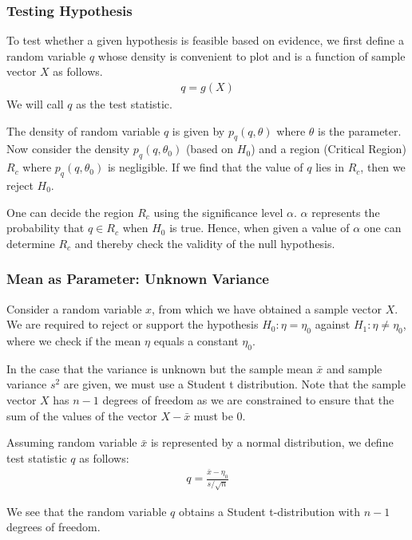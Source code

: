 \documentclass{beamer}
\begin{document}
\begin{frame}
	\frametitle{Testing Hypothesis}
	To test whether a given hypothesis is feasible based on evidence, we first define a random variable $q$ whose density is convenient to plot and is a function of sample vector $X$ as follows.
	\begin{align}
		q = g(X)
		\label{eq:TestStat}
	\end{align}
	We will call $q$ as the test statistic.

	The density of random variable $q$ is given by $p_q(q, \theta)$ where $\theta$ is the parameter. Now consider the density $p_q(q, \theta_0)$ (based on $H_0$) and a region (Critical Region) $R_c$ where $p_q(q, \theta_0)$ is negligible. If we find that the value of $q$ lies in $R_c$, then we reject $H_0$.

	One can decide the region $R_c$ using the significance level $\alpha$. $\alpha$ represents the probability that $q \in R_c$ when $H_0$ is true. Hence, when given a value of $\alpha$ one can determine $R_c$ and thereby check the validity of the null hypothesis. 
\end{frame}

\begin{frame}
	\frametitle{Mean as Parameter: Unknown Variance}
	Consider a random variable $x$, from which we have obtained a sample vector $X$. We are required to reject or support the hypothesis $H_0: \eta = \eta_0$ against $H_1: \eta \neq \eta_0$, where we check if the mean $\eta$ equals a constant $\eta_0$.

	In the case that the variance is unknown but the sample mean $\bar{x}$ and sample variance $s^2$ are given, we must use a Student t distribution. Note that the sample vector $X$ has $n - 1$ degrees of freedom as we are constrained to ensure that the sum of the values of the vector $X - \bar{x}$ must be 0.

	Assuming random variable $\bar{x}$ is represented by a normal distribution, we define test statistic $q$ as follows:
	\begin{align}
		q = \frac{\bar{x} - \eta_0}{s/\sqrt{n}}
		\label{eq:UnknownVar}
	\end{align}
	
	We see that the random variable $q$ obtains a Student t-distribution with $n - 1$ degrees of freedom.
\end{frame}
\end{document}
